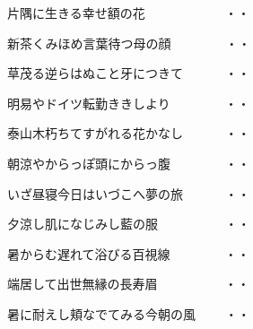 \vspace{0.6cm}
\begin{shiika}片隅に生きる幸せ額の花　　　　　　
\hfill{・・}\end{shiika}
\vspace{0.6cm}
\begin{shiika}新茶くみほめ言葉待つ母の顔　　　　
\hfill{・・}\end{shiika}
\vspace{0.6cm}
\begin{shiika}草茂る逆らはぬこと牙につきて　　　
\hfill{・・}\end{shiika}
\vspace{0.6cm}
\begin{shiika}明易やドイツ転勤ききしより　　　　
\hfill{・・}\end{shiika}
\vspace{0.6cm}
\begin{shiika}泰山木朽ちてすがれる花かなし　　　
\hfill{・・}\end{shiika}
\vspace{0.6cm}
\begin{shiika}朝涼やからっぽ頭にからっ腹　　　　
\hfill{・・}\end{shiika}
\vspace{0.6cm}
\begin{shiika}いざ昼寝今日はいづこへ夢の旅　　　
\hfill{・・}\end{shiika}
\vspace{0.6cm}
\begin{shiika}夕涼し肌になじみし藍の服　　　　　
\hfill{・・}\end{shiika}
\vspace{0.6cm}
\begin{shiika}暑からむ遅れて浴びる百視線　　　　
\hfill{・・}\end{shiika}
\vspace{0.6cm}
\begin{shiika}端居して出世無縁の長寿眉　　　　　
\hfill{・・}\end{shiika}
\vspace{0.6cm}
\begin{shiika}暑に耐えし頬なでてみる今朝の風　　
\hfill{・・}\end{shiika}
